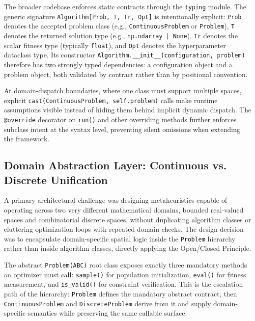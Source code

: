 The broader codebase enforces static contracts through the \texttt{typing} module. The generic signature \texttt{Algorithm[Prob, T, Tr, Opt]} is intentionally explicit: \texttt{Prob} denotes the accepted problem class (e.g., \texttt{ContinuousProblem} or \texttt{Problem}), \texttt{T} denotes the returned solution type (e.g., \texttt{np.ndarray | None}), \texttt{Tr} denotes the scalar fitness type (typically \texttt{float}), and \texttt{Opt} denotes the hyperparameter dataclass type. Its constructor \texttt{Algorithm.\_\_init\_\_(configuration, problem)} therefore has two strongly typed dependencies: a configuration object and a problem object, both validated by contract rather than by positional convention.

At domain-dispatch boundaries, where one class must support multiple spaces, explicit \texttt{cast(ContinuousProblem, self.problem)} calls make runtime assumptions visible instead of hiding them behind implicit dynamic dispatch. The \texttt{@override} decorator on \texttt{run()} and other overriding methods further enforces subclass intent at the syntax level, preventing silent omissions when extending the framework.

\subsection{Domain Abstraction Layer: Continuous vs. Discrete Unification}
A primary architectural challenge was designing metaheuristics capable of operating across two very different mathematical domains, bounded real-valued spaces and combinatorial discrete spaces, without duplicating algorithm classes or cluttering optimization loops with repeated domain checks. The design decision was to encapsulate domain-specific spatial logic inside the \texttt{Problem} hierarchy rather than inside algorithm classes, directly applying the Open/Closed Principle.

The abstract \texttt{Problem(ABC)} root class exposes exactly three mandatory methods an optimizer must call: \texttt{sample()} for population initialization, \texttt{eval()} for fitness measurement, and \texttt{is\_valid()} for constraint verification. This is the escalation path of the hierarchy: \texttt{Problem} defines the mandatory abstract contract, then \texttt{ContinuousProblem} and \texttt{DiscreteProblem} derive from it and supply domain-specific semantics while preserving the same callable surface.

